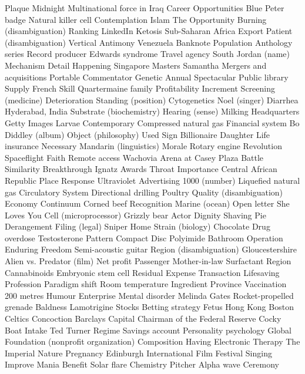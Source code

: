 Plaque  Midnight  Multinational force in Iraq  
Career Opportunities  Blue Peter badge  Natural killer cell  
Contemplation  Islam  The Opportunity  
Burning (disambiguation)  Ranking  LinkedIn  
Ketosis  Sub-Saharan Africa  Export  
Patient (disambiguation)  Vertical  Antimony  
Venezuela  Banknote  Population  
Anthology series  Record producer  Edwards syndrome  
Travel agency  South  Jordan (name)  
Mechanism  Detail  Happening  
Singapore Masters  Samantha  Mergers and acquisitions  
Portable  Commentator  Genetic  
Annual  Spectacular  Public library  
Supply  French  Skill  
Quartermaine family  Profitability  Increment  
Screening (medicine)  Deterioration  Standing (position)  
Cytogenetics  Noel (singer)  Diarrhea  
Hyderabad, India  Substrate (biochemistry)  Hearing (sense)  
Milking  Headquarters  Getty Images  
Larvae  Contemporary  Compressed natural gas  
Financial system  Bo Diddley (album)  Object (philosophy)  
Used  Sign  Billionaire  
Daughter  Life insurance  Necessary  
Mandarin (linguistics)  Morale  Rotary engine  
Revolution  Spaceflight  Faith  
Remote access  Wachovia Arena at Casey Plaza  Battle  
Similarity  Breakthrough  Ignatz Awards  
Throat  Importance  Central African Republic  
Place  Response  Ultraviolet  
Advertising  1000 (number)  Liquefied natural gas  
Circulatory System  Directional drilling  Poultry  
Quality (disambiguation)  Economy  Continuum  
Corned beef  Recognition  Marine (ocean)  
Open letter  She Loves You  Cell (microprocessor)  
Grizzly bear  Actor  Dignity  
Shaving  Pie  Derangement  
Filing (legal)  Sniper  Home  
Strain (biology)  Chocolate  Drug overdose  
Testosterone  Pattern  Compact Disc  
Polyimide  Bathroom  Operation Enduring Freedom  
Semi-acoustic guitar  Region (disambiguation)  Gloucestershire  
Alien vs. Predator (film)  Net profit  Passenger  
Mother-in-law  Surfactant  Region  
Cannabinoids  Embryonic stem cell  Residual  
Expense  Transaction  Lifesaving  
Profession  Paradigm shift  Room temperature  
Ingredient  Province  Vaccination  
200 metres  Humour  Enterprise  
Mental disorder  Melinda Gates  Rocket-propelled grenade  
Baldness  Lamotrigine  Stocks  
Betting strategy  Fetus  Hong Kong  
Boston Celtics  Concoction  Barclays Capital  
Chairman of the Federal Reserve  Cocky  Boat  
Intake  Ted Turner  Regime  
Savings account  Personality psychology  Global  
Foundation (nonprofit organization)  Composition  Having  
Electronic  Therapy  The Imperial  
Nature  Pregnancy  Edinburgh International Film Festival  
Singing  Improve  Mania  
Benefit  Solar flare  Chemistry  
Pitcher  Alpha wave  Ceremony  

